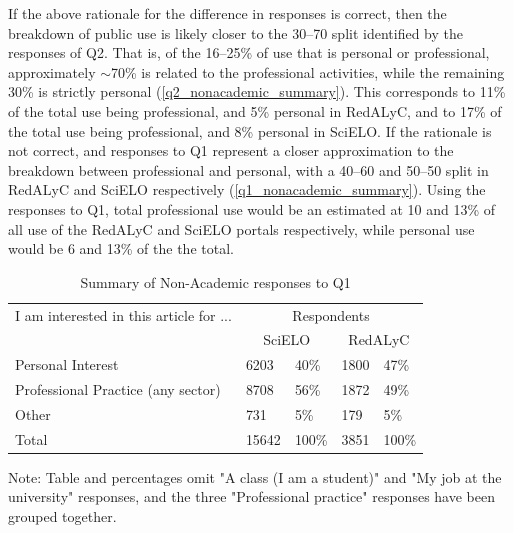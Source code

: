 If the above rationale for the difference in responses is correct, then the breakdown of public use is likely closer to the 30--70 split identified by the responses of Q2. That is, of the 16--25\% of use that is personal or professional, approximately \ensuremath{\sim}70\% is related to the professional activities, while the remaining 30\% is strictly personal (\autoref{q2_nonacademic_summary}). This corresponds to 11\% of the total use being professional, and 5\% personal in RedALyC, and to 17\% of the total use being professional, and 8\% personal in SciELO. If the rationale is not correct, and responses to Q1 represent a closer approximation to the breakdown between professional and personal, with a 40--60 and 50--50 split in RedALyC and SciELO respectively (\autoref{q1_nonacademic_summary}). Using the responses to Q1, total professional use would be an estimated at 10 and 13\% of all use of the RedALyC and SciELO portals respectively, while personal use would be 6 and 13\% of the the total.




\begin{table}[!htbp]
\centering
\caption{Summary of Non-Academic responses to Q1} \label{q1_nonacademic_summary}
\begin{threeparttable}
\begin{tabular}{@{}lllll@{}}
\toprule
I am interested in this article for ... &\multicolumn{4}{c}{Respondents} \\ \cmidrule{2-4}
    &   \multicolumn{2}{c}{SciELO}  &   \multicolumn{2}{c}{RedALyC} \\ \midrule
Personal Interest   &   6203    &   40\%    &   1800    &   47\%    \\
Professional Practice (any sector)  &   8708    &   56\%    &   1872    &   49\%    \\
Other   &   731 &   5\% &   179 &   5\% \\ \midrule
Total   &   15642   &   100\%   &   3851    &   100\%   \\ \bottomrule
\end{tabular}
\begin{tablenotes}
\small
\item Note: Table and percentages omit "A class (I am a student)" and "My job at the university" responses, and the three "Professional practice" responses have been grouped together.
\end{tablenotes}
\end{threeparttable}
\end{table}

